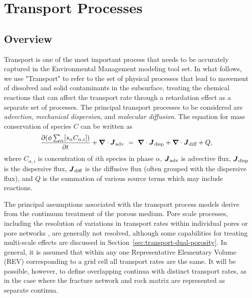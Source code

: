 %
%
%

\section{Transport Processes}    
\label{sec:transport-processes}

\subsection{Overview}

Transport is one of the most important process that needs to be accurately 
captured in the Environmental Management modeling tool set.  
In what follows, we use "Transport" to refer to the set of physical processes 
that lead to movement of dissolved and solid contaminants in the subsurface, 
treating the chemical reactions that can affect the transport 
rate through a retardation effect as a separate set of processes.  
The principal transport processes to be considered are 
\emph{advection}, \emph{mechanical dispersion}, and \emph{molecular diffusion}.  
The equation for mass conservation of species $C$ can be written as
$$\label{eq:concervation of mass general}
  \frac{\partial ( \phi \sum_\alpha [s_{\alpha} C_{\alpha,i}] )}{\partial t } +
  {\boldsymbol{\nabla}} \cdot {\boldsymbol{J}}_{\text{adv}} \ =\  {\boldsymbol{\nabla}} \cdot {\boldsymbol{J}}_{\text{disp}} + {\boldsymbol{\nabla}} \cdot {\boldsymbol{J}}_{\text{diff}} + Q,
$$
where $C_{\alpha,i}$ is concentration of $i$th species in phase $\alpha$, 
${\boldsymbol{J}}_{\text{adv}}$ is advective flux, ${\boldsymbol{J}}_{\text{disp}}$ is the dispersive flux, 
${\boldsymbol{J}}_{\text{diff}}$ is the diffusive flux (often grouped with the dispersive flux), and  
$Q$ is the summation of various source terms which may include reactions.


The principal assumptions associated with the transport process models derive 
from the continuum treatment of the porous medium.  
Pore scale processes, including the resolution of variations in transport rates 
within individual pores or pore networks \citep{li2008scale,kang2006lattice,lichtner-kang-2007}, 
are generally not resolved, although some capabilities for treating multi-scale 
effects are discussed in Section~\ref{sec:transport-dual-porosity}.  
In general, it is assumed that within any one Representative Elementary Volume (REV) 
corresponding to a grid cell all transport rates are the same.  
It will be possible, however, to define overlapping continua with distinct transport 
rates, as in the case where the fracture network and rock matrix are represented as separate continua.

